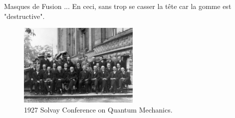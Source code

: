 	\begin{frame}{Masques de Fusion}
		... En ceci, sans trop se casser la tête car la gomme est "destructive".

		\begin{figure}[H]
			\centering
			\includegraphics[height=150px]{Images/mask/Conference_Solvay}
			\caption{\scriptsize{1927 Solvay Conference on Quantum Mechanics.}}
		\end{figure}

	\end{frame}




